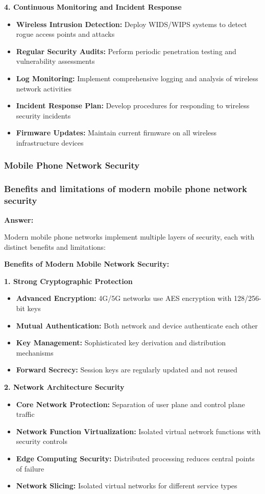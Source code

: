 \documentclass[12pt,a4paper]{article}
\begin{document}
\textbf{4. Continuous Monitoring and Incident Response}
\begin{itemize}
    \item \textbf{Wireless Intrusion Detection:} Deploy WIDS/WIPS systems to detect rogue access points and attacks
    \item \textbf{Regular Security Audits:} Perform periodic penetration testing and vulnerability assessments
    \item \textbf{Log Monitoring:} Implement comprehensive logging and analysis of wireless network activities
    \item \textbf{Incident Response Plan:} Develop procedures for responding to wireless security incidents
    \item \textbf{Firmware Updates:} Maintain current firmware on all wireless infrastructure devices
\end{itemize}

\subsubsection{Mobile Phone Network Security}

\subsubsection{Benefits and limitations of modern mobile phone network security}

\textbf{Answer:}

Modern mobile phone networks implement multiple layers of security, each with distinct benefits and limitations:

\textbf{Benefits of Modern Mobile Network Security:}

\textbf{1. Strong Cryptographic Protection}
\begin{itemize}
    \item \textbf{Advanced Encryption:} 4G/5G networks use AES encryption with 128/256-bit keys
    \item \textbf{Mutual Authentication:} Both network and device authenticate each other
    \item \textbf{Key Management:} Sophisticated key derivation and distribution mechanisms
    \item \textbf{Forward Secrecy:} Session keys are regularly updated and not reused
\end{itemize}

\textbf{2. Network Architecture Security}
\begin{itemize}
    \item \textbf{Core Network Protection:} Separation of user plane and control plane traffic
    \item \textbf{Network Function Virtualization:} Isolated virtual network functions with security controls
    \item \textbf{Edge Computing Security:} Distributed processing reduces central points of failure
    \item \textbf{Network Slicing:} Isolated virtual networks for different service types
\end{itemize}
\end{document}
